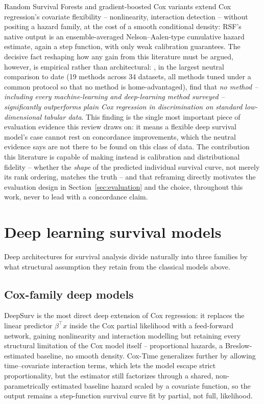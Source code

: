 \documentclass[11pt]{article}
\begin{document}
Random Survival Forests \citep{ishwaran2008rsf} and gradient-boosted
Cox variants extend Cox regression's covariate flexibility -- nonlinearity,
interaction detection -- without positing a hazard family, at the cost of a
smooth conditional density: RSF's native output is an ensemble-averaged
Nelson--Aalen-type cumulative hazard estimate, again a step function, with
only weak calibration guarantees. The decisive fact reshaping how any
gain from this literature must be argued, however, is empirical rather
than architectural: \citet{burk2024neutral}, in the largest neutral
comparison to date (19 methods across 34 datasets, all methods tuned
under a common protocol so that no method is home-advantaged), find that
\emph{no method -- including every machine-learning and deep-learning
method surveyed -- significantly outperforms plain Cox regression in
discrimination on standard low-dimensional tabular data}. This finding is
the single most important piece of evaluation evidence this review draws
on: it means a flexible deep survival model's case cannot rest on
concordance improvements, which the neutral evidence says are not there to
be found on this class of data. The contribution this literature is
capable of making instead is calibration and distributional fidelity --
whether the \emph{shape} of the predicted individual survival curve,
not merely its rank ordering, matches the truth -- and that reframing
directly motivates the evaluation design in Section~\ref{sec:evaluation}
and the choice, throughout this work, never to lead with a concordance
claim.

\section{Deep learning survival models}
\label{sec:dl}

Deep architectures for survival analysis divide naturally into three
families by what structural assumption they retain from the classical
models above.

\subsection{Cox-family deep models}
DeepSurv \citep{katzman2018deepsurv} is the most direct deep extension of
Cox regression: it replaces the linear predictor $\beta^\top x$ inside the
Cox partial likelihood with a feed-forward network, gaining nonlinearity
and interaction modelling but retaining every structural limitation of the
Cox model itself -- proportional hazards, a Breslow-estimated baseline, no
smooth density. Cox-Time \citep{kvamme2019coxtime} generalizes further by
allowing time--covariate interaction terms, which lets the model escape
strict proportionality, but the estimator still factorizes through a
shared, non-parametrically estimated baseline hazard scaled by a
covariate function, so the output remains a step-function survival curve
fit by partial, not full, likelihood.
\end{document}
